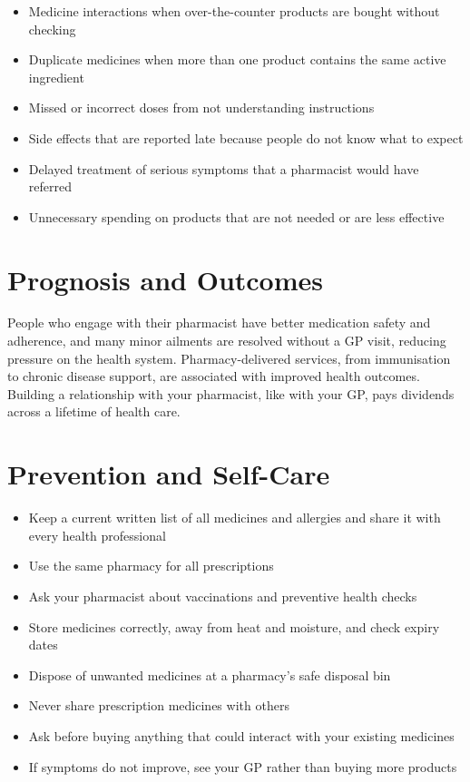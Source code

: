 \begin{itemize}
    \item Medicine interactions when over-the-counter products are bought without checking
    \item Duplicate medicines when more than one product contains the same active ingredient
    \item Missed or incorrect doses from not understanding instructions
    \item Side effects that are reported late because people do not know what to expect
    \item Delayed treatment of serious symptoms that a pharmacist would have referred
    \item Unnecessary spending on products that are not needed or are less effective
\end{itemize}

\section*{Prognosis and Outcomes}
People who engage with their pharmacist have better medication safety and adherence, and many minor ailments are resolved without a GP visit, reducing pressure on the health system. Pharmacy-delivered services, from immunisation to chronic disease support, are associated with improved health outcomes. Building a relationship with your pharmacist, like with your GP, pays dividends across a lifetime of health care.

\section*{Prevention and Self-Care}
\begin{itemize}
    \item Keep a current written list of all medicines and allergies and share it with every health professional
    \item Use the same pharmacy for all prescriptions
    \item Ask your pharmacist about vaccinations and preventive health checks
    \item Store medicines correctly, away from heat and moisture, and check expiry dates
    \item Dispose of unwanted medicines at a pharmacy's safe disposal bin
    \item Never share prescription medicines with others
    \item Ask before buying anything that could interact with your existing medicines
    \item If symptoms do not improve, see your GP rather than buying more products
\end{itemize}

